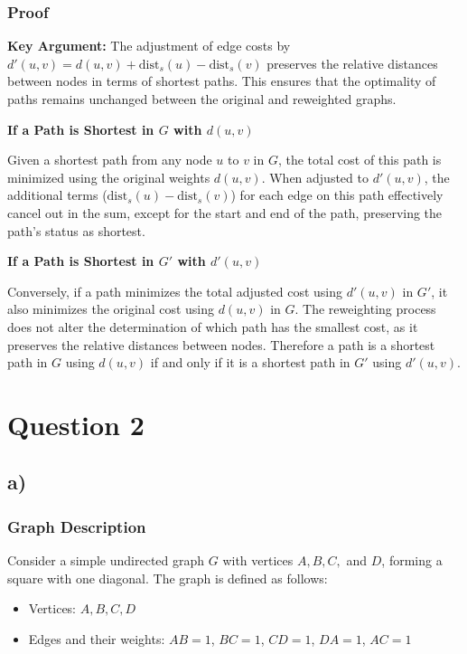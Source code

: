 \documentclass{article}
\begin{document}
\subsubsection{Proof}


\textbf{Key Argument: }The adjustment of edge costs by $d'(u, v) = d(u, v) + \text{dist}_s(u) - \text{dist}_s(v)$ preserves the relative distances between nodes in terms of shortest paths. This ensures that the optimality of paths remains unchanged between the original and reweighted graphs.

\textbf{If a Path is Shortest in $G$ with $d(u, v)$}

Given a shortest path from any node $u$ to $v$ in $G$, the total cost of this path is minimized using the original weights $d(u, v)$. When adjusted to $d'(u, v)$, the additional terms ($\text{dist}_s(u) - \text{dist}_s(v)$) for each edge on this path effectively cancel out in the sum, except for the start and end of the path, preserving the path's status as shortest.

\textbf{If a Path is Shortest in $G'$ with $d'(u, v)$}

Conversely, if a path minimizes the total adjusted cost using $d'(u, v)$ in $G'$, it also minimizes the original cost using $d(u, v)$ in $G$. The reweighting process does not alter the determination of which path has the smallest cost, as it preserves the relative distances between nodes.
Therefore a path is a shortest path in $G$ using $d(u, v)$ if and only if it is a shortest path in $G'$ using $d'(u, v)$.
\section{Question 2}
\subsection{a)}
\subsubsection{Graph Description}

Consider a simple undirected graph \(G\) with vertices \(A, B, C,\) and \(D\), forming a square with one diagonal. The graph is defined as follows:

\begin{itemize}
    \item Vertices: \(A, B, C, D\)
    \item Edges and their weights: \(AB = 1\), \(BC = 1\), \(CD = 1\), \(DA = 1\), \(AC = 1\)
\end{itemize}
\end{document}
